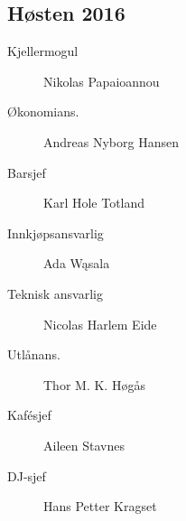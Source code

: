 {\begin{minipage}{0.6\textwidth}
\subsection*{Høsten 2016}

\begin{description}
	\item[Kjellermogul] Nikolas Papaioannou
	\item[Økonomians.] Andreas Nyborg Hansen
	\item[Barsjef] Karl Hole Totland
	\item[Innkjøpsansvarlig] Ada Wąsala
	\item[Teknisk ansvarlig] Nicolas Harlem Eide
	\item[Utlånans.] Thor M. K. Høgås
	\item[Kafésjef] Aileen Stavnes
	\item[DJ-sjef] Hans Petter Kragset
\end{description}
\end{minipage}
}



